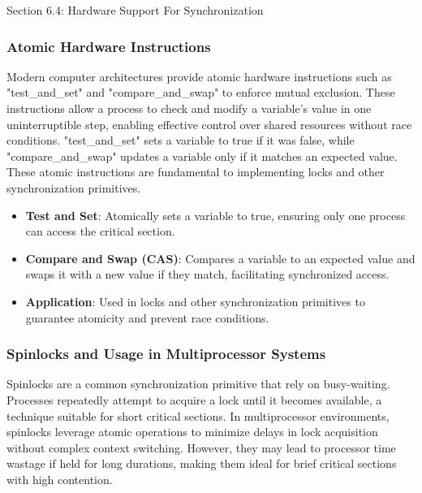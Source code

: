 \begin{notes}{Section 6.4: Hardware Support For Synchronization}
\begin{highlight}
    \end{highlight}
    
    \subsubsection*{Atomic Hardware Instructions}
    
    Modern computer architectures provide atomic hardware instructions such as "test\_and\_set" and "compare\_and\_swap" to enforce mutual exclusion. These instructions allow a process to check and 
    modify a variable's value in one uninterruptible step, enabling effective control over shared resources without race conditions. "test\_and\_set" sets a variable to true if it was false, while 
    "compare\_and\_swap" updates a variable only if it matches an expected value. These atomic instructions are fundamental to implementing locks and other synchronization primitives.
    
    \begin{highlight}
    
        \begin{itemize}
            \item \textbf{Test and Set}: Atomically sets a variable to true, ensuring only one process can access the critical section.
            \item \textbf{Compare and Swap (CAS)}: Compares a variable to an expected value and swaps it with a new value if they match, facilitating synchronized access.
            \item \textbf{Application}: Used in locks and other synchronization primitives to guarantee atomicity and prevent race conditions.
        \end{itemize}
    
    \end{highlight}
    
    \subsubsection*{Spinlocks and Usage in Multiprocessor Systems}
    
    Spinlocks are a common synchronization primitive that rely on busy-waiting. Processes repeatedly attempt to acquire a lock until it becomes available, a technique suitable for short critical 
    sections. In multiprocessor environments, spinlocks leverage atomic operations to minimize delays in lock acquisition without complex context switching. However, they may lead to processor time 
    wastage if held for long durations, making them ideal for brief critical sections with high contention.
    

\end{notes}
